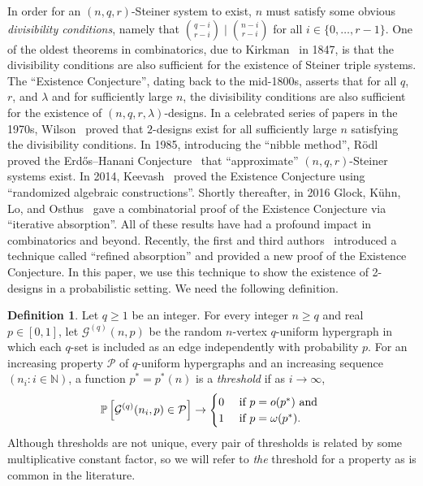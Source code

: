 \documentclass[11pt]{article}
\numberwithin{equation}{section}
\newcounter{i}
\theoremstyle{plain}
\theoremstyle{plain} %
\theoremstyle{definition}
\newtheorem{definition}[thm]{Definition}
\newcommand{\cP}{\mathcal{P}}
\newcommand{\cG}{\mathcal{G}}
\newcommand{\Prob}[1]{\ensuremath{%
\mathbb P\left[#1\right]
}}
\begin{document}
In order for an $(n,q,r)$-Steiner system to exist, $n$ must satisfy some obvious \textit{divisibility conditions}, namely that $\binom{q - i}{r - i} \mid \binom{n - i}{r - i}$ for all $i \in \{0, \dots, r - 1\}$.  
One of the oldest theorems in combinatorics, due to Kirkman~\cite{K47} in 1847, is that the divisibility conditions are also sufficient for the existence of Steiner triple systems.  The ``Existence Conjecture'', dating back to the mid-1800s, asserts that for all $q$, $r$, and $\lambda$ and for sufficiently large $n$, the divisibility conditions are also sufficient for the existence of $(n,q,r, \lambda)$-designs.
In a celebrated series of papers in the 1970s, Wilson~\cite{WiI, WiII, WiIII} proved that $2$-designs exist for all sufficiently large $n$ satisfying the divisibility conditions.
In 1985, introducing the ``nibble method'', R\"odl~\cite{R85} proved the Erd\H{o}s--Hanani Conjecture~\cite{EH63} that ``approximate'' $(n,q,r)$-Steiner systems exist.
In 2014, Keevash~\cite{K14} proved the Existence Conjecture using ``randomized algebraic constructions''.  Shortly thereafter, in 2016 Glock, K\"uhn, Lo, and Osthus~\cite{GKLO16} gave a combinatorial proof of the Existence Conjecture via ``iterative absorption''.  All of these results have had a profound impact in combinatorics and beyond.
Recently, the first and third authors~\cite{DPI} introduced a technique called ``refined absorption'' and provided a new proof of the Existence Conjecture.  In this paper, we use this technique to show the existence of 2-designs in a probabilistic setting.
We need the following definition.


\begin{definition}
    Let $q \geq 1$ be an integer.  For every integer $n \geq q$ and real $p \in [0,1]$, let $\cG^{(q)}(n,p)$ be the random $n$-vertex $q$-uniform hypergraph in which each $q$-set is included as an edge independently with probability $p$.
    For an increasing property $\cP$ of $q$-uniform hypergraphs and an increasing sequence $(n_i : i \in \mathbb N)$, a function $p^*=p^*(n)$ is a \textit{threshold} if as $i \rightarrow \infty$,
\begin{equation*}
\Prob{ \cG^{(q)}(n_i,p) \in \mathcal{P} } \rightarrow 
 \begin{cases}
      0 & \text{ if }  p=o(p^*) \text{ and }\\
      1 & \text { if } p=\omega(p^*).
    \end{cases} 
 \end{equation*}   
  Although thresholds are not unique, every pair of thresholds is related by some multiplicative constant factor, so we will refer to \textit{the} threshold for a property as is common in the literature.
\end{definition}
\end{document}
